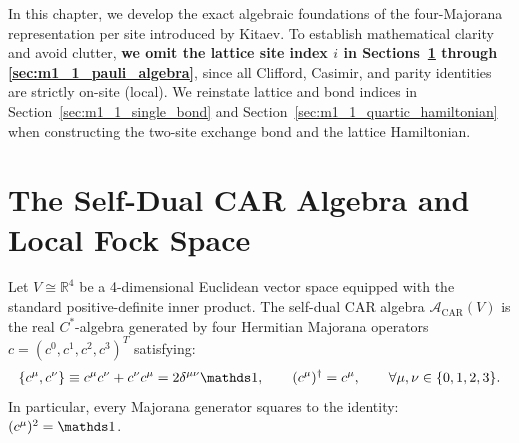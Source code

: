In this chapter, we develop the exact algebraic foundations of the four-Majorana representation per site introduced by Kitaev. To establish mathematical clarity and avoid clutter, \textbf{we omit the lattice site index $i$ in Sections~\ref{sec:m1_1_car_algebra} through \ref{sec:m1_1_pauli_algebra}}, since all Clifford, Casimir, and parity identities are strictly on-site (local). We reinstate lattice and bond indices in Section~\ref{sec:m1_1_single_bond} and Section~\ref{sec:m1_1_quartic_hamiltonian} when constructing the two-site exchange bond and the lattice Hamiltonian.

\section{The Self-Dual CAR Algebra and Local Fock Space}
\label{sec:m1_1_car_algebra}

\begin{definition}
\label{def:m1_1_car_algebra}
Let $V \cong \mathbb{R}^4$ be a 4-dimensional Euclidean vector space equipped with the standard positive-definite inner product. The self-dual CAR algebra $\mathcal{A}_{\mathrm{CAR}}(V)$ is the real $C^*$-algebra generated by four Hermitian Majorana operators $c = (c^0, c^1, c^2, c^3)^T$ satisfying:
\begin{equation}
\label{eq:m1_1_car_anticommutator}
\{c^\mu, c^\nu\} \equiv c^\mu c^\nu + c^\nu c^\mu = 2 \delta^{\mu\nu} \Id, \qquad (c^\mu)^\dagger = c^\mu, \qquad \forall \mu, \nu \in \{0, 1, 2, 3\}.
\end{equation}
In particular, every Majorana generator squares to the identity: $(c^\mu)^2 = \Id$.
\end{definition}

